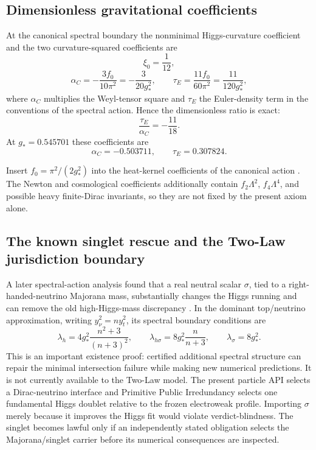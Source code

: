 \subsection{Dimensionless gravitational coefficients}

\begin{theorem}
\label{thm:csc-gravity-ratios}
At the canonical spectral boundary the nonminimal Higgs-curvature coefficient and the two
curvature-squared coefficients are
\[
 \boxed{\xi_0=\frac1{12}},
\]
\[
 \boxed{
 \alpha_C=-\frac{3f_0}{10\pi^2}=-\frac{3}{20g_*^2},
 \qquad
 \tau_E=\frac{11f_0}{60\pi^2}=\frac{11}{120g_*^2},
 }
\]
where $\alpha_C$ multiplies the Weyl-tensor square and $\tau_E$ the Euler-density term in
the conventions of the spectral action.  Hence the dimensionless ratio is exact:
\[
 \boxed{\frac{\tau_E}{\alpha_C}=-\frac{11}{18}}.
\]
At $g_*=0.545701$ these coefficients are
\[
 \alpha_C=-0.503711,
 \qquad
 \tau_E=0.307824.
\]
\end{theorem}

\begin{proofsketch}
Insert $f_0=\pi^2/(2g_*^2)$ into the heat-kernel coefficients of the canonical action
\cite{chamseddine-connes-marcolli}.  The Newton and cosmological coefficients additionally
contain $f_2\Lambda^2$, $f_4\Lambda^4$, and possible heavy finite-Dirac invariants, so they
are not fixed by the present axiom alone.
\end{proofsketch}

\subsection{The known singlet rescue and the Two-Law jurisdiction boundary}

A later spectral-action analysis found that a real neutral scalar $\sigma$, tied to a
right-handed-neutrino Majorana mass, substantially changes the Higgs running and can remove
the old high-Higgs-mass discrepancy \cite{chamseddine-connes-resilience}.  In the dominant
top/neutrino approximation, writing $y_\nu^2=n y_t^2$, its spectral boundary conditions are
\[
 \boxed{
 \lambda_h=4g_*^2\frac{n^2+3}{(n+3)^2},
 \qquad
 \lambda_{h\sigma}=8g_*^2\frac{n}{n+3},
 \qquad
 \lambda_\sigma=8g_*^2.
 }
\]
This is an important existence proof: certified additional spectral structure can repair the
minimal intersection failure while making new numerical predictions.  It is not currently
available to the Two-Law model.  The present particle API selects a Dirac-neutrino interface
and Primitive Public Irredundancy selects one fundamental Higgs doublet relative to the
frozen electroweak profile.  Importing $\sigma$ merely because it improves the Higgs fit would
violate verdict-blindness.  The singlet becomes lawful only if an independently stated
obligation selects the Majorana/singlet carrier before its numerical consequences are
inspected.

